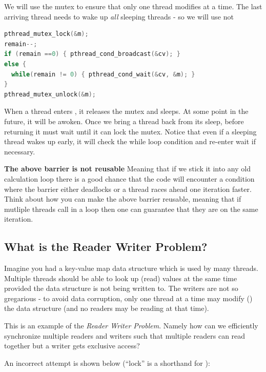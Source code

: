 We will use the mutex to ensure that only one thread modifies  at a time. The last arriving thread needs to wake up \emph{all} sleeping threads - so we will use  not 

\begin{lstlisting}[language=C]
pthread_mutex_lock(&m);
remain--; 
if (remain ==0) { pthread_cond_broadcast(&cv); }
else {
  while(remain != 0) { pthread_cond_wait(&cv, &m); }
}
pthread_mutex_unlock(&m);
\end{lstlisting}

When a thread enters , it releases the mutex and sleeps. At some point in the future, it will be awoken. Once we bring a thread back from its sleep, before returning it must wait until it can lock the mutex. Notice that even if a sleeping thread wakes up early, it will check the while loop condition and re-enter wait if necessary.

\textbf{The above barrier is not reusable} Meaning that if we stick it into any old calculation loop there is a good chance that the code will encounter a condition where the barrier either deadlocks or a thread races ahead one iteration faster. Think about how you can make the above barrier reusable, meaning that if mutliple threads call  in a loop then one can guarantee that they are on the same iteration.

\subsection{What is the Reader Writer Problem?}\label{what-is-the-reader-writer-problem}

Imagine you had a key-value map data structure which is used by many threads. Multiple threads should be able to look up (read) values at the same time provided the data structure is not being written to. The writers are not so gregarious - to avoid data corruption, only one thread at a time may modify () the data structure (and no readers may be reading at that time).

This is an example of the \emph{Reader Writer Problem}. Namely how can we efficiently synchronize multiple readers and writers such that multiple readers can read together but a writer gets exclusive access?

An incorrect attempt is shown below (``lock'' is a shorthand for ):


